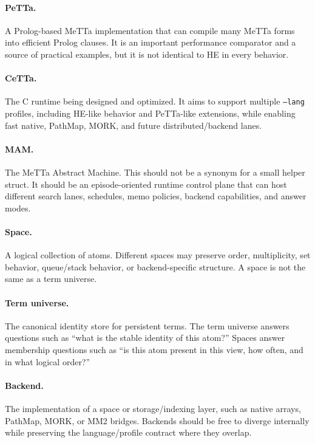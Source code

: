 \documentclass[11pt]{article}
\newcommand{\CeTTa}{CeTTa}
\newcommand{\MeTTa}{MeTTa}
\newcommand{\PeTTa}{PeTTa}
\newcommand{\HE}{HE}
\newcommand{\MAM}{MAM}
\newcommand{\PathMap}{PathMap}
\newcommand{\MORK}{MORK}
\newcommand{\MM}{MM2}
\begin{document}
\paragraph{\PeTTa{}.}  A Prolog-based \MeTTa{} implementation that can compile many \MeTTa{} forms into efficient Prolog clauses.  It is an important performance comparator and a source of practical examples, but it is not identical to \HE{} in every behavior.

\paragraph{\CeTTa{}.}  The C runtime being designed and optimized.  It aims to support multiple \texttt{--lang} profiles, including \HE{}-like behavior and \PeTTa{}-like extensions, while enabling fast native, \PathMap{}, \MORK{}, and future distributed/backend lanes.

\paragraph{\MAM{}.}  The MeTTa Abstract Machine.  This should not be a synonym for a small helper struct.  It should be an episode-oriented runtime control plane that can host different search lanes, schedules, memo policies, backend capabilities, and answer modes.

\paragraph{Space.}  A logical collection of atoms.  Different spaces may preserve order, multiplicity, set behavior, queue/stack behavior, or backend-specific structure.  A space is not the same as a term universe.

\paragraph{Term universe.}  The canonical identity store for persistent terms.  The term universe answers questions such as ``what is the stable identity of this atom?'' Spaces answer membership questions such as ``is this atom present in this view, how often, and in what logical order?''

\paragraph{Backend.}  The implementation of a space or storage/indexing layer, such as native arrays, \PathMap{}, \MORK{}, or \MM{} bridges.  Backends should be free to diverge internally while preserving the language/profile contract where they overlap.
\end{document}
